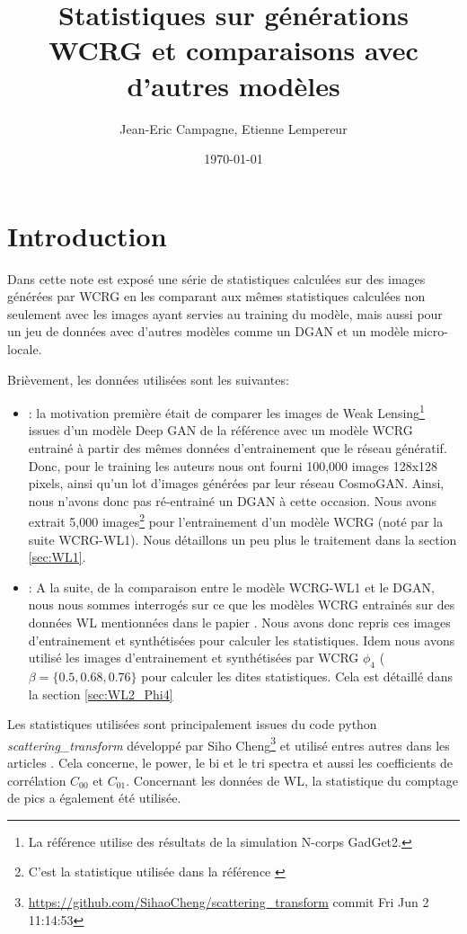 \documentclass[12pt,twoside]{article}
\title{Statistiques sur générations WCRG et comparaisons avec d'autres modèles}
\author{Jean-Eric Campagne, Etienne Lempereur}
\date{\today}
\begin{document}
\maketitle

\tableofcontents

\section{Introduction}
Dans cette note est exposé une série de statistiques calculées sur des images générées par WCRG \citep{2023arXiv230600181G} en les comparant aux mêmes statistiques calculées non seulement avec les images ayant servies au training du modèle, mais aussi pour un jeu de données avec d'autres modèles comme un DGAN et un modèle micro-locale.

Brièvement, les données utilisées sont les suivantes: 
\begin{itemize}
\item[WL-1]: la motivation première était de comparer les images de Weak Lensing\footnote{La référence utilise des résultats de la simulation N-corps GadGet2.} issues d'un modèle Deep GAN de la référence \citep{2019ComAC...6....1M} avec un modèle WCRG entrainé à partir des mêmes données d'entrainement que le réseau génératif. Donc, pour le training les auteurs nous ont fourni 100,000 images 128x128 pixels, ainsi qu'un lot d'images générées par leur réseau CosmoGAN. Ainsi, nous n'avons donc pas ré-entrainé un DGAN à cette occasion. Nous avons extrait 5,000 images\footnote{C'est la statistique utilisée dans la référence \citep{2023arXiv230600181G}} pour l'entrainement d'un modèle WCRG (noté par la suite WCRG-WL1). Nous détaillons un peu plus le traitement dans la section \ref{sec:WL1}.
\item[WL-2 \& $\phi_4$]:  A la suite, de la comparaison entre le modèle WCRG-WL1 et le DGAN, nous nous sommes interrogés sur ce que les modèles WCRG entrainés sur des données WL mentionnées dans le papier \citep{2023arXiv230600181G}. Nous avons donc repris ces images d'entrainement et synthétisées pour calculer les statistiques. Idem nous avons utilisé les images d'entrainement et synthétisées par WCRG $\phi_4$ ($\beta=\{0.5, 0.68, 0.76\}$ pour calculer les dites statistiques. Cela est détaillé dans la section \ref{sec:WL2_Phi4}
\end{itemize}

Les statistiques utilisées sont principalement issues du code python \textit{scattering\_transform} développé par Siho Cheng\footnote{\url{https://github.com/SihaoCheng/scattering_transform} commit Fri Jun 2 11:14:53}
et utilisé entres autres dans les articles \citep{2021arXiv211201288C, 2023arXiv230617210C}. Cela concerne, le power, le bi et le tri spectra et aussi les coefficients de corrélation $C_{00}$ et $C_{01}$. Concernant les données de WL, la statistique du comptage de pics a également été utilisée. 
\end{document}

